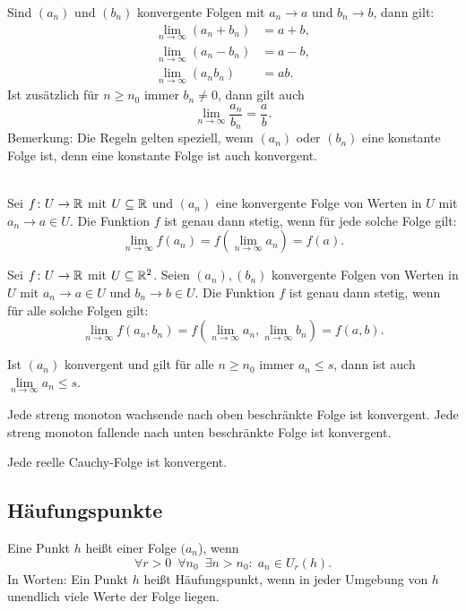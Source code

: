 \minisection
{} Sind $(a_n)$ und $(b_n)$ konvergente
Folgen mit $a_n\to a$ und $b_n\to b$, dann gilt:
\begin{align}
\lim_{n\to\infty} (a_n+b_n) &= a+b,\\
\lim_{n\to\infty} (a_n-b_n) &= a-b,\\
\lim_{n\to\infty} (a_n b_n) &= ab.
\end{align}
Ist zusätzlich für $n\ge n_0$ immer $b_n\ne 0$, dann gilt auch
\begin{equation}
\lim_{n\to\infty} \frac{a_n}{b_n} = \frac{a}{b}.
\end{equation}
Bemerkung: Die Regeln gelten speziell, wenn $(a_n)$ oder $(b_n)$
eine konstante Folge ist, denn eine konstante Folge ist auch
konvergent.

\newpage
\noindent{}\\
Sei $f\colon U\to\mathbb R$ mit $U\subseteq\mathbb R$ und $(a_n)$ eine konvergente
Folge von Werten in $U$ mit $a_n\to a\in U$.
Die Funktion $f$ ist genau dann stetig, wenn für jede solche
Folge gilt:
\begin{equation}
\lim_{n\to\infty} f(a_n) = f(\lim_{n\to\infty} a_n) = f(a).
\end{equation}

\noindent
Sei $f\colon U\to\mathbb R$ mit $U\subseteq\mathbb R^2$.
Seien $(a_n),(b_n)$ konvergente Folgen von Werten in $U$ mit
$a_n\to a\in U$ und $b_n\to b\in U$. Die Funktion $f$ ist genau dann
stetig, wenn für alle solche Folgen gilt:
\begin{equation}
\lim_{n\to\infty} f(a_n,b_n)
= f(\lim_{n\to\infty}a_n,\lim_{n\to\infty} b_n)
= f(a,b).
\end{equation}

\noindent
{}
Ist $(a_n)$ konvergent und gilt für alle $n\ge n_0$ immer $a_n\le s$,
dann ist auch $\lim\limits_{n\to\infty} a_n\le s$.

\minisection{}
Jede streng monoton wachsende nach oben beschränkte Folge ist
konvergent. Jede streng monoton fallende nach unten beschränkte
Folge ist konvergent.

\minisection{}
Jede reelle Cauchy-Folge ist konvergent.


\subsection{Häufungspunkte}
\begin{definition}[Häufungspunkt]\mbox{}\newline
Eine Punkt $h$ heißt  einer Folge $(a_n$), wenn
\begin{equation}
\forall r{>}0\enspace\forall n_0\enspace\exists n{>}n_0\colon\;
a_n\in U_r(h).
\end{equation}
In Worten: Ein Punkt $h$ heißt Häufungspunkt, wenn in jeder Umgebung
von $h$ unendlich viele Werte der Folge liegen.
\end{definition}

